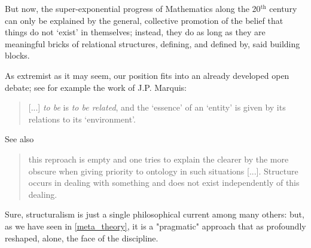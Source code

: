 But now, the super-exponential progress of Mathematics along the 20$^\text{th}$ century can only be explained by the general, collective promotion of the belief that things do not `exist' in themselves; instead, they do as long as they are meaningful bricks of relational structures, defining, and defined by, said building blocks.

As extremist as it may seem, our position fits into an already developed open debate; see for example the work of J.P. Marquis:
\begin{quote}
	[...] \emph{to be} is \emph{to be related}, and the `essence' of an `entity' is given by its relations to its `environment'.
	\hfill \cite{Marquis1997}
\end{quote}
See also
\begin{quote}
	this reproach is empty and one tries to explain the clearer by the more obscure when giving priority to ontology in such situations [...]. Structure occurs in dealing with something and does not exist independently of this dealing. \cite{kromer2007tool}
\end{quote}
Sure, structuralism is just a single philosophical current among many others: but, as we have seen in \autoref{meta_theory}, it is a "pragmatic" approach that as profoundly reshaped, alone, the face of the discipline.



